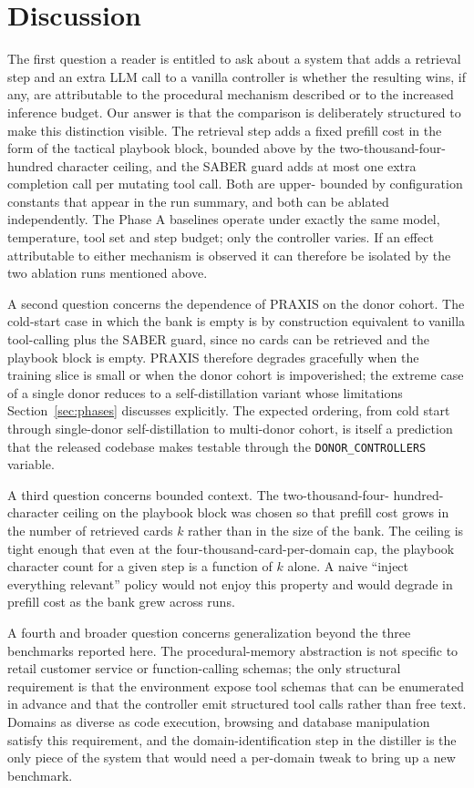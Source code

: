 \documentclass[conference]{IEEEtran}
\begin{document}
\section{Discussion}

The first question a reader is entitled to ask about a system
that adds a retrieval step and an extra LLM call to a vanilla
controller is whether the resulting wins, if any, are attributable
to the procedural mechanism described or to the increased
inference budget. Our answer is that the comparison is
deliberately structured to make this distinction visible. The
retrieval step adds a fixed prefill cost in the form of the
tactical playbook block, bounded above by the two-thousand-four-
hundred character ceiling, and the SABER guard adds at most one
extra completion call per mutating tool call. Both are upper-
bounded by configuration constants that appear in the run summary,
and both can be ablated independently. The Phase A baselines
operate under exactly the same model, temperature, tool set and
step budget; only the controller varies. If an effect attributable
to either mechanism is observed it can therefore be isolated by
the two ablation runs mentioned above.

A second question concerns the dependence of PRAXIS on the donor
cohort. The cold-start case in which the bank is empty is by
construction equivalent to vanilla tool-calling plus the SABER
guard, since no cards can be retrieved and the playbook block is
empty. PRAXIS therefore degrades gracefully when the training
slice is small or when the donor cohort is impoverished; the
extreme case of a single donor reduces to a self-distillation
variant whose limitations Section~\ref{sec:phases} discusses
explicitly. The expected ordering, from cold start through
single-donor self-distillation to multi-donor cohort, is itself a
prediction that the released codebase makes testable through the
\texttt{DONOR\_CONTROLLERS} variable.

A third question concerns bounded context. The two-thousand-four-
hundred-character ceiling on the playbook block was chosen so
that prefill cost grows in the number of retrieved cards $k$
rather than in the size of the bank. The ceiling is tight enough
that even at the four-thousand-card-per-domain cap, the playbook
character count for a given step is a function of $k$ alone. A
naive ``inject everything relevant'' policy would not enjoy this
property and would degrade in prefill cost as the bank grew across
runs.

A fourth and broader question concerns generalization beyond the
three benchmarks reported here. The procedural-memory abstraction
is not specific to retail customer service or function-calling
schemas; the only structural requirement is that the environment
expose tool schemas that can be enumerated in advance and that the
controller emit structured tool calls rather than free text.
Domains as diverse as code execution, browsing and database
manipulation satisfy this requirement, and the
domain-identification step in the distiller is the only piece of
the system that would need a per-domain tweak to bring up a new
benchmark.
\end{document}
